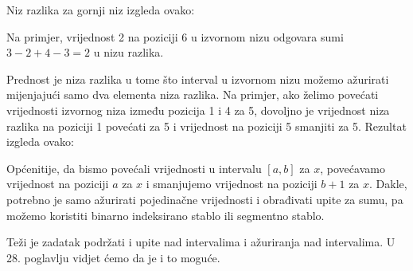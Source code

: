 Niz razlika za gornji niz izgleda ovako:
\begin{center}
\end{center}

Na primjer, vrijednost 2 na poziciji 6 u izvornom nizu
odgovara sumi $3-2+4-3=2$ u nizu razlika.

Prednost je niza razlika u tome
što interval u izvornom nizu
možemo ažurirati mijenjajući samo
dva elementa niza razlika.
Na primjer, ako želimo 
povećati vrijednosti izvornog niza 
između pozicija 1 i 4 za 5,
dovoljno je vrijednost niza razlika
na poziciji 1 povećati za 5
i vrijednost na poziciji 5 smanjiti za 5.
Rezultat izgleda ovako:

\begin{center}
\end{center}

Općenitije, da bismo povećali vrijednosti
u intervalu $[a,b]$ za $x$,
povećavamo vrijednost na poziciji $a$ za $x$
i smanjujemo vrijednost na poziciji $b+1$ za $x$.
Dakle, potrebno je samo ažurirati pojedinačne vrijednosti
i obrađivati upite za sumu,
pa možemo koristiti binarno indeksirano stablo ili segmentno stablo.

Teži je zadatak podržati i
upite nad intervalima i ažuriranja nad intervalima.
U 28. poglavlju vidjet ćemo da je i to moguće.




